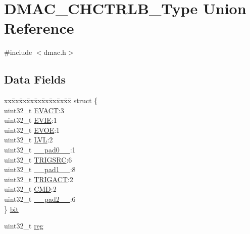 \hypertarget{union_d_m_a_c___c_h_c_t_r_l_b___type}{}\section{D\+M\+A\+C\+\_\+\+C\+H\+C\+T\+R\+L\+B\+\_\+\+Type Union Reference}
\label{union_d_m_a_c___c_h_c_t_r_l_b___type}


{\ttfamily \#include $<$dmac.\+h$>$}

\subsection*{Data Fields}
\begin{DoxyCompactItemize}
\item 
\begin{tabbing}
xx\=xx\=xx\=xx\=xx\=xx\=xx\=xx\=xx\=\kill
struct \{\\
\>uint32\_t \mbox{\hyperlink{union_d_m_a_c___c_h_c_t_r_l_b___type_a1eef14d8487852257e65d0d1a8b4c09e}{EVACT}}:3\\
\>uint32\_t \mbox{\hyperlink{union_d_m_a_c___c_h_c_t_r_l_b___type_a48247b43a49a016b5c466358e6ecfb01}{EVIE}}:1\\
\>uint32\_t \mbox{\hyperlink{union_d_m_a_c___c_h_c_t_r_l_b___type_a29f1993a0dcf1625ca7e036729879e58}{EVOE}}:1\\
\>uint32\_t \mbox{\hyperlink{union_d_m_a_c___c_h_c_t_r_l_b___type_a438a21076875a9e76a62a43ced5b7bea}{LVL}}:2\\
\>uint32\_t \mbox{\hyperlink{union_d_m_a_c___c_h_c_t_r_l_b___type_a3e57c2ef1c3ffb36722f000cc1156824}{\_\_pad0\_\_}}:1\\
\>uint32\_t \mbox{\hyperlink{union_d_m_a_c___c_h_c_t_r_l_b___type_a282c4cf62463a275c204ae9f519d5887}{TRIGSRC}}:6\\
\>uint32\_t \mbox{\hyperlink{union_d_m_a_c___c_h_c_t_r_l_b___type_a6712ba6dd1d5b43d2d56ff8ac4e275a7}{\_\_pad1\_\_}}:8\\
\>uint32\_t \mbox{\hyperlink{union_d_m_a_c___c_h_c_t_r_l_b___type_a7a54d5ba22711cd05b6b18662851de3c}{TRIGACT}}:2\\
\>uint32\_t \mbox{\hyperlink{union_d_m_a_c___c_h_c_t_r_l_b___type_a6114f503a02e060bd76b962d5c0e35c3}{CMD}}:2\\
\>uint32\_t \mbox{\hyperlink{union_d_m_a_c___c_h_c_t_r_l_b___type_a9ce12a63de64ef64ae2d59d128251cae}{\_\_pad2\_\_}}:6\\
\} \mbox{\hyperlink{union_d_m_a_c___c_h_c_t_r_l_b___type_a414965f0da683218fe1ebbb96dca377a}{bit}}\\

\end{tabbing}\item 
uint32\+\_\+t \mbox{\hyperlink{union_d_m_a_c___c_h_c_t_r_l_b___type_a6b91636401516a477989a336376d7b40}{reg}}
\end{DoxyCompactItemize}


